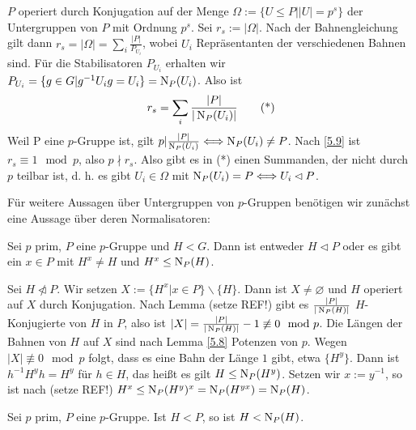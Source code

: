 \begin{beweis}
 $P$ operiert durch Konjugation auf der Menge $\Omega:=\lbrace U\leq P||U|=p^s\rbrace$ der Untergruppen von $P$ mit Ordnung $p^s$. Sei $r_s:=|\Omega|$. Nach der Bahnengleichung gilt dann $r_s=|\Omega|=\sum_i{\frac{|P|}{P_{U_i}}}$, wobei $U_i$ Repr\"asentanten der verschiedenen Bahnen sind. F\"ur die Stabilisatoren $P_{U_i}$ erhalten wir $P_{U_i}=\lbrace g\in G|g^{-1}U_ig=U_i\rbrace = \operatorname{N}_P(U_i)$. Also ist 
\begin{equation*}
 r_s=\sum_i{\frac{|P|}{|\operatorname{N}_P(U_i)|}} \tag{*}
\end{equation*}
Weil P eine $p$-Gruppe ist, gilt $ p|\frac{|P|}{\operatorname{N}_P(U_i)} \Longleftrightarrow \operatorname{N}_P(U_i) \neq P$. Nach \ref{5.9} ist $r_s\equiv 1\mod p$, also $p\nmid r_s$. Also gibt es in (*) einen Summanden, der nicht durch $p$ teilbar ist, d. h. es gibt $U_i\in \Omega$ mit $\operatorname{N}_P(U_i) = P \Longleftrightarrow U_i \lhd P$.
\end{beweis}

F\"ur weitere Aussagen \"uber Untergruppen von $p$-Gruppen ben\"otigen wir zun\"achst eine Aussage \"uber deren Normalisatoren:
\begin{lemma}[Matsuyama] \label{5.11}
 Sei $p$ prim, $P$ eine $p$-Gruppe und $H < G$. Dann ist entweder $H\vartriangleleft P$ oder es gibt ein $x\in P$ mit $H^x \neq H$ und $H^x \leq \operatorname{N}_P(H)$. 
\end{lemma}
\begin{beweis}
 Sei $H\ntriangleleft P$. Wir setzen $X:=\lbrace H^x|x\in P\rbrace \backslash \lbrace H\rbrace$. Dann ist $X\neq \varnothing$ und $H$ operiert auf $X$ durch Konjugation. Nach Lemma (setze REF!) gibt es $\frac{|P|}{|\operatorname{N}_P(H)|}$ $H$-Konjugierte von $H$ in $P$, also ist $|X|=\frac{|P|}{|\operatorname{N}_P(H)|}-1\not\equiv 0\mod p$. Die L\"angen der Bahnen von $H$ auf $X$ sind nach Lemma \ref{5.8} Potenzen von $p$. Wegen $|X|\not\equiv 0\mod p$ folgt, dass es eine Bahn der L\"ange $1$ gibt, etwa $\lbrace H^y\rbrace$. Dann ist $h^{-1}H^yh=H^y$ f\"ur $h\in H$, das hei\ss{}t es gilt $H\leq \operatorname{N}_P(H^y)$. Setzen wir $x:=y^{-1}$, so ist nach (setze REF!) $H^x\leq \operatorname{N}_P(H^y)^x=\operatorname{N}_P(H^{yx})=\operatorname{N}_P(H)$.
\end{beweis}

\begin{folgerung} \label{5.12}
 Sei $p$ prim, $P$ eine $p$-Gruppe. Ist $H <P$, so ist $H < \operatorname{N}_P(H)$.
\end{folgerung}

